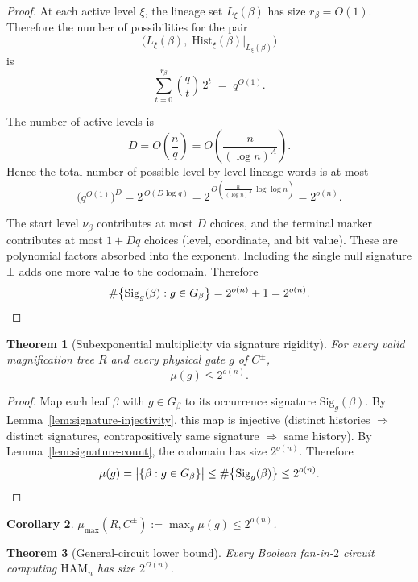 \documentclass[11pt]{article}
\newtheorem{theorem}{Theorem}[section]
\newtheorem{corollary}[theorem]{Corollary}
\newcommand{\Ham}{\mathrm{HAM}}
\begin{document}
\begin{proof}
At each active level $\xi$, the lineage set $L_\xi(\beta)$ has size
$r_\beta = O(1)$.  Therefore the number of possibilities for the pair
\[
\bigl(L_\xi(\beta),\;
\mathrm{Hist}_\xi(\beta)\big|_{L_\xi(\beta)}\bigr)
\]
is
\[
\sum_{t=0}^{r_\beta} \binom{q}{t}\, 2^t
\;=\; q^{O(1)}.
\]

The number of active levels is
\[
D = O\!\left(\frac{n}{q}\right)
  = O\!\left(\frac{n}{(\log n)^A}\right).
\]
Hence the total number of possible level-by-level lineage words is at
most
\[
\bigl(q^{O(1)}\bigr)^D
= 2^{\,O(D \log q)}
= 2^{\,O\!\left(\frac{n}{(\log n)^A}\,\log\log n\right)}
= 2^{o(n)}.
\]

The start level $\nu_\beta$ contributes at most $D$ choices, and the
terminal marker contributes at most $1 + Dq$ choices (level, coordinate,
and bit value).  These are polynomial factors absorbed into the
exponent.  Including the single null signature $\bot$ adds one more
value to the codomain.  Therefore
\[
\#\bigl\{\mathrm{Sig}_g(\beta) : g \in G_\beta\bigr\}
= 2^{o(n)} + 1 = 2^{o(n)}. \qedhere
\]
\end{proof}

\begin{theorem}[Subexponential multiplicity via signature rigidity]
\label{thm:subexp-multiplicity-pse}
For every valid magnification tree $R$ and every physical gate $g$
of $C^{\pm}$,
\[
\mu(g) \le 2^{o(n)}.
\]
\end{theorem}

\begin{proof}
Map each leaf $\beta$ with $g \in G_\beta$ to its occurrence signature
$\mathrm{Sig}_g(\beta)$.  By
Lemma~\ref{lem:signature-injectivity}, this map is injective (distinct
histories $\Rightarrow$ distinct signatures, contrapositively same
signature $\Rightarrow$ same history).  By
Lemma~\ref{lem:signature-count}, the codomain has size $2^{o(n)}$.
Therefore
\[
\mu(g) = \bigl|\{\beta : g \in G_\beta\}\bigr|
\le \#\bigl\{\mathrm{Sig}_g(\beta)\bigr\}
\le 2^{o(n)}. \qedhere
\]
\end{proof}

\begin{corollary}
\label{cor:mu-max-subexp}
$\mu_{\max}(R, C^{\pm}) := \max_g \mu(g) \le 2^{o(n)}$.
\end{corollary}

\begin{theorem}[General-circuit lower bound]
\label{thm:general-circuit-lower-bound}
Every Boolean fan-in-$2$ circuit computing $\Ham_n$ has size
$2^{\Omega(n)}$.
\end{theorem}
\end{document}
